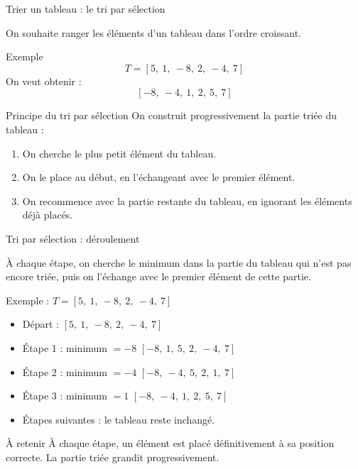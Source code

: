 \documentclass[10pt]{beamer}
\begin{document}
\begin{frame}{Trier un tableau : le tri par sélection}

On souhaite ranger les éléments d'un tableau dans l'ordre
croissant.

\begin{exampleblock}{Exemple}
\[
T = [5,\ 1,\ -8,\ 2,\ -4,\ 7]
\]
On veut obtenir :
\[
[-8,\ -4,\ 1,\ 2,\ 5,\ 7]
\]
\end{exampleblock}

\pause

\begin{block}{Principe du tri par sélection}
On construit progressivement la partie triée du tableau :

\begin{enumerate}
    \item On cherche le plus petit élément du tableau.
    \item On le place au début, en l'échangeant avec le premier élément.
    \item On recommence avec la partie restante du tableau,
    en ignorant les éléments déjà placés.
\end{enumerate}
\end{block}

\end{frame}
\begin{frame}{Tri par sélection : déroulement}

À chaque étape, on cherche le minimum dans la partie
du tableau qui n'est pas encore triée, puis on l'échange
avec le premier élément de cette partie.

\begin{exampleblock}{Exemple : $T = [5,\ 1,\ -8,\ 2,\ -4,\ 7]$}
\small
\begin{itemize}
    \item Départ : \quad $[5,\ 1,\ -8,\ 2,\ -4,\ 7]$
    \pause
    \item Étape 1 : minimum $=-8$ \quad
    $[-8,\ 1,\ 5,\ 2,\ -4,\ 7]$
    \pause
    \item Étape 2 : minimum $=-4$ \quad
    $[-8,\ -4,\ 5,\ 2,\ 1,\ 7]$
    \pause
    \item Étape 3 : minimum $=1$ \quad
    $[-8,\ -4,\ 1,\ 2,\ 5,\ 7]$
    \pause
    \item Étapes suivantes : le tableau reste inchangé.
\end{itemize}
\end{exampleblock}

\pause

\begin{alertblock}{À retenir}
À chaque étape, un élément est placé définitivement
à sa position correcte. La partie triée grandit progressivement.
\end{alertblock}

\end{frame}
\end{document}
